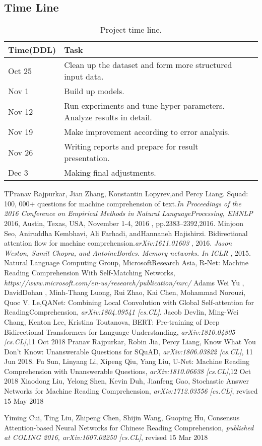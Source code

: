 \documentclass{article}
\begin{document}
\subsection{Time Line}
\begin{table}[htbp]\centering
	\begin{tabular}{lll}
		\hline\hline
		Time(DDL)& Task\\
		\hline
		Oct 25	& Clean up the dataset and form more structured input data.\\
		Nov 1	& Build up models.\\
		Nov 12	& Run experiments and tune hyper parameters. Analyze results in detail.\\
		Nov 19	& Make improvement according to error analysis.\\
		Nov 26	& Writing reports and prepare for result presentation.\\
		Dec 3	& Making final adjustments.\\
		\hline
	\end{tabular}
	\caption{Project time line.}\label{tab:hh}
\end{table}

\nocite{*}

\begin{thebibliography}{99}
TPranav Rajpurkar, Jian Zhang, Konstantin Lopyrev,and Percy Liang. Squad: 100, 000+ questions for machine comprehension of text.\emph{In Proceedings of the 2016 Conference on Empirical Methods in Natural LanguageProcessing, EMNLP} 2016, Austin, Texas, USA, November 1-4, 2016 , pp.2383–2392,2016.
 Minjoon Seo, Aniruddha Kembhavi, Ali Farhadi, andHannaneh Hajishirzi. Bidirectional attention flow for machine comprehension.\emph{arXiv:1611.01603} , 2016. \emph{Jason Weston, Sumit Chopra, and AntoineBordes. Memory networks. In ICLR} , 2015.
 Natural Language Computing Group, MicrosoftResearch Asia, R-Net: Machine Reading Comprehension With Self-Matching Networks, \emph{https://www.microsoft.com/en-us/research/publication/mrc/}
Adams Wei Yu , DavidDohan , Minh-Thang Luong, Rui Zhao, Kai Chen, Mohammad Norouzi, Quoc V. Le,QANet: Combining Local Convolution with Global Self-attention for ReadingComprehension, \emph{arXiv:1804.09541 [cs.CL]}.
Jacob Devlin, Ming-Wei Chang, Kenton Lee, Kristina Toutanova, BERT: Pre-training of Deep Bidirectional Transformers for Language Understanding, \emph{arXiv:1810.04805 [cs.CL]},11 Oct 2018
Pranav Rajpurkar, Robin Jia, Percy Liang, Know What You Don't Know: Unanswerable Questions for SQuAD, \emph{arXiv:1806.03822 [cs.CL]}, 11 Jun 2018.
Fu Sun, Linyang Li, Xipeng Qiu, Yang Liu, U-Net: Machine Reading Comprehension with Unanswerable Questions, \emph{arXiv:1810.06638 [cs.CL]},12 Oct 2018
Xiaodong Liu, Yelong Shen, Kevin Duh, Jianfeng Gao, Stochastic Answer Networks for Machine Reading Comprehension, \emph{arXiv:1712.03556 [cs.CL]}, revised 15 May 2018

Yiming Cui, Ting Liu, Zhipeng Chen, Shijin Wang, Guoping Hu, Consensus Attention-based Neural Networks for Chinese Reading Comprehension, \emph{published at COLING 2016, arXiv:1607.02250 [cs.CL]}, revised 15 Mar 2018
\end{thebibliography}

\end{document}
